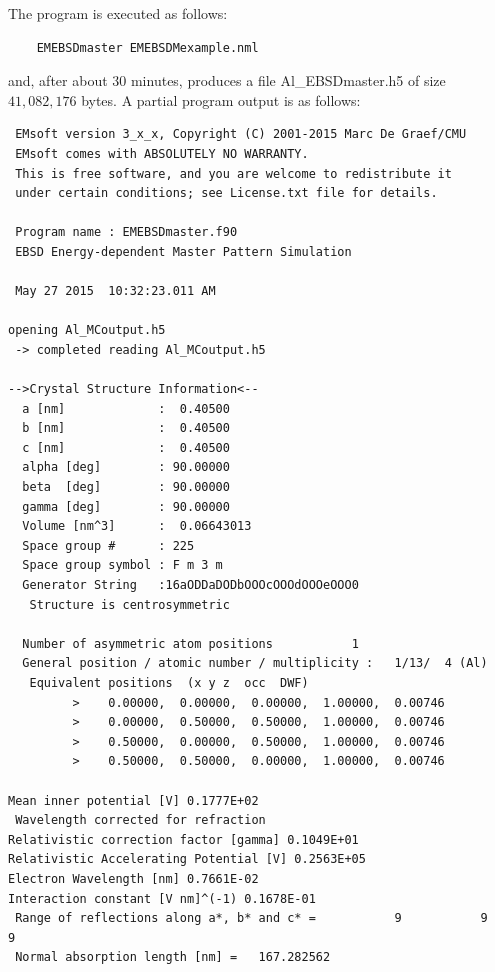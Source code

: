 \documentclass[DIV=calc, paper=letter, fontsize=11pt]{scrartcl}	 %
\begin{document}
The program is executed as follows:
\begin{verbatim}
	EMEBSDmaster EMEBSDMexample.nml
\end{verbatim}
and, after about $30$ minutes, produces a file \textsf{Al\_EBSDmaster.h5} of size $41,082,176$ bytes.  A partial program output
is as follows:
\begin{verbatim}
 EMsoft version 3_x_x, Copyright (C) 2001-2015 Marc De Graef/CMU
 EMsoft comes with ABSOLUTELY NO WARRANTY.
 This is free software, and you are welcome to redistribute it
 under certain conditions; see License.txt file for details.

 Program name : EMEBSDmaster.f90
 EBSD Energy-dependent Master Pattern Simulation

 May 27 2015  10:32:23.011 AM

opening Al_MCoutput.h5
 -> completed reading Al_MCoutput.h5

-->Crystal Structure Information<--
  a [nm]             :  0.40500
  b [nm]             :  0.40500
  c [nm]             :  0.40500
  alpha [deg]        : 90.00000
  beta  [deg]        : 90.00000
  gamma [deg]        : 90.00000
  Volume [nm^3]      :  0.06643013
  Space group #      : 225
  Space group symbol : F m 3 m
  Generator String   :16aODDaDODbOOOcOOOdOOOeOOO0
   Structure is centrosymmetric

  Number of asymmetric atom positions           1
  General position / atomic number / multiplicity :   1/13/  4 (Al)
   Equivalent positions  (x y z  occ  DWF)
         >    0.00000,  0.00000,  0.00000,  1.00000,  0.00746
         >    0.00000,  0.50000,  0.50000,  1.00000,  0.00746
         >    0.50000,  0.00000,  0.50000,  1.00000,  0.00746
         >    0.50000,  0.50000,  0.00000,  1.00000,  0.00746

Mean inner potential [V] 0.1777E+02
 Wavelength corrected for refraction
Relativistic correction factor [gamma] 0.1049E+01
Relativistic Accelerating Potential [V] 0.2563E+05
Electron Wavelength [nm] 0.7661E-02
Interaction constant [V nm]^(-1) 0.1678E-01
 Range of reflections along a*, b* and c* =           9           9           9
 Normal absorption length [nm] =   167.282562    


\end{verbatim}
\end{document}
